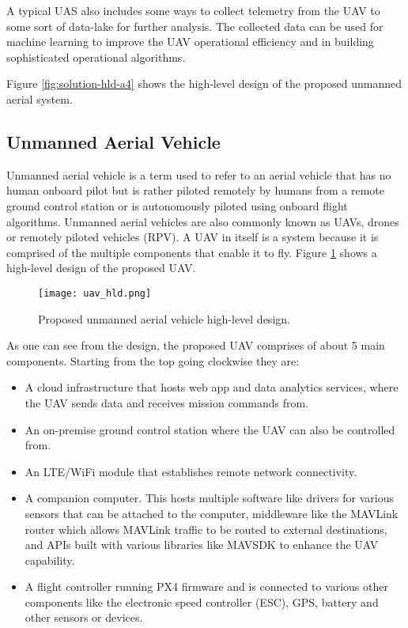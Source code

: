 A typical UAS also includes some ways to collect telemetry from the UAV to some sort of data-lake for further analysis. The collected data can be used for machine learning to improve the UAV operational efficiency and in building sophisticated operational algorithms.

Figure \ref{fig:solution-hld-a4} shows the high-level design of the proposed unmanned aerial system.



\subsection{Unmanned Aerial Vehicle}
\label{subsec:uav}

Unmanned aerial vehicle is a term used to refer to an aerial vehicle that has no human onboard pilot but is rather piloted remotely by humans from a remote ground control station or is autonomously piloted using onboard flight algorithms. Unmanned aerial vehicles are also commonly known as UAVs, drones or remotely piloted vehicles (RPV). A UAV in itself is a system because it is comprised of the multiple components that enable it to fly. Figure \ref{fig:uav-hld} shows a high-level design of the proposed UAV.

\begin{figure}[H]
    \centering \texttt{[image: uav\_hld.png]}
    \caption{Proposed unmanned aerial vehicle high-level design.}
    \label{fig:uav-hld}
\end{figure}

As one can see from the design, the proposed UAV comprises of about 5 main components. Starting from the top going clockwise they are:
\begin{itemize}
    \item A cloud infrastructure that hosts web app and data analytics services, where the UAV sends data and receives mission commands from.
    \item An on-premise ground control station where the UAV can also be controlled from.
    \item An LTE/WiFi module that establishes remote network connectivity.
    \item A companion computer. This hosts multiple software like drivers for various sensors that can be attached to the computer, middleware like the MAVLink router which allows MAVLink traffic to be routed to external destinations, and APIs built with various libraries like MAVSDK\cite{mavsdk} to enhance the UAV capability.
    \item A flight controller running PX4 firmware and is connected to various other components like the electronic speed controller (ESC), GPS, battery and other sensors or devices.
\end{itemize}

